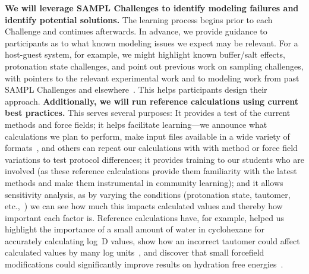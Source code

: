 \documentclass[11pt]{article}
\begin{document}
\textbf{We will leverage SAMPL Challenges to identify modeling failures and identify potential solutions.} 
The learning process begins prior to each Challenge and continues afterwards. 
In advance,  we provide guidance to participants as to what known modeling issues we expect may be relevant.
For a host-guest system, for example, we might highlight known buffer/salt effects, protonation state challenges, and point out previous work on sampling challenges, with pointers to the relevant experimental work and to modeling work from past SAMPL Challenges and elsewhere~\cite{Mobley:2017:AnnualReviewofBiophysics}.
This helps participants design their approach.
{\bf Additionally, we will run reference calculations using current best practices.} 
This serves several purposes:
It provides a test of the current methods and force fields; it helps facilitate learning---we announce what calculations we plan to perform, make input files available in a wide variety of formats~\cite{shirts_lessons_2016, yin_overview_2016, Bannan:2016:JComputAidedMolDes}, and others can repeat our calculations with with method or force field variations to test protocol differences; it provides training to our students who are involved (as these reference calculations provide them familiarity with the latest methods and make them instrumental in community learning);  and it allows sensitivity analysis, as by varying the conditions (protonation state, tautomer, etc.,~\cite{Bannan:2016:JComputAidedMolDes}) we can see how much this impacts calculated values and thereby how important each factor is.
Reference calculations have, for example, helped us highlight the importance of a small amount of water in cyclohexane for accurately calculating log~D values, show how an incorrect tautomer could affect calculated values by many log units~\cite{Bannan:2016:JComputAidedMolDes}, and discover that small forcefield modifications could significantly improve results on hydration free energies~\cite{mobley_blind_2014-1}.
\end{document}

